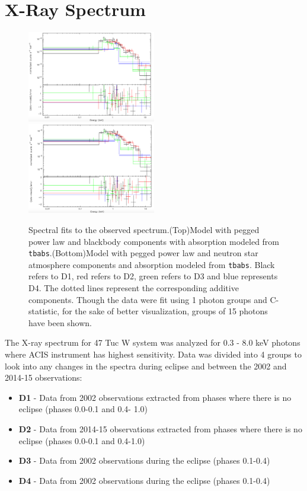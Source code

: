 \documentclass[a4paper,fleqn,usenatbib]{mnras}
\begin{document}
\section{X-Ray Spectrum}
\begin{figure}
 \centering
 \includegraphics[width=0.5\textwidth]{Figures/blackbody.png}
 \includegraphics[width=0.5\textwidth]{Figures/nsat.png}
 \caption{Spectral fits to the observed spectrum.(Top)Model with pegged power law and blackbody components with absorption modeled
 from \texttt{tbabs}.(Bottom)Model with pegged power law and neutron star atmosphere components and absorption modeled from \texttt{tbabs}. Black refers
 to D1, red refers to D2, green refers to D3 and blue represents D4. The dotted lines represent the corresponding additive components. Though the data were fit using 1 photon groups and C-statistic, for the sake of better visualization, groups of 15 photons have been shown.}
 \label{fig:spec_fit}
\end{figure}

The X-ray spectrum for 47 Tuc W system was analyzed for 0.3 - 8.0 keV photons where ACIS instrument has highest sensitivity. Data was
divided into 4 groups to look into any changes in the spectra during eclipse and between the 2002 and 2014-15 observations:
\begin{itemize}
 \item \textbf{D1} - Data from 2002 observations extracted from phases where there is no eclipse (phases 0.0-0.1 and 0.4- 1.0)
 \item \textbf{D2} - Data from 2014-15 observations extracted from phases where there is no eclipse (phases 0.0-0.1 and 0.4-1.0)
 \item \textbf{D3} - Data from 2002 observations during the eclipse (phases 0.1-0.4)
 \item \textbf{D4} - Data from 2002 observations during the eclipse (phases 0.1-0.4)
\end{itemize}
\end{document}
